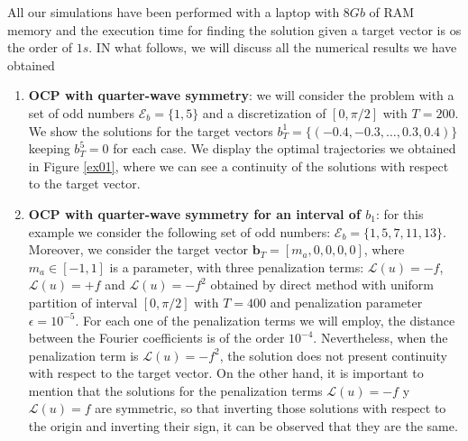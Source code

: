 All our simulations have been performed with a laptop with $8Gb$ of RAM memory and the execution time for finding the solution given a target vector is os the order of $1s$. IN what follows, we will discuss all the numerical results we have obtained
\begin{enumerate}    
    \item \textbf{OCP with quarter-wave symmetry}: we will consider the problem with a set of odd numbers $\mathcal{E}_b = \{1,5\}$ and a discretization of $[0,\pi/2]$ with $T = 200$. We show the solutions for the target vectors $b_T^1 = \{(-0.4,-0.3,\dots,0.3,0.4)\}$ keeping $b_T^5=0$ for each case. We display the optimal trajectories we obtained in Figure \ref{ex01}, where we can see a continuity of the solutions with respect to the target vector.



    \item \textbf{OCP with quarter-wave symmetry for an interval of $b_1$}: for this example we consider the following set of odd numbers: $\mathcal{E}_b = \{1,5,7,11,13\}$. 
    Moreover, we consider the target vector $\bm{b}_T = [m_a,0,0,0,0]$, where $m_a \in [-1,1]$ is a parameter, with three penalization terms: $\mathcal{L}(u) = -f$, $\mathcal{L}(u) = +f$ and $\mathcal{L}(u) = -f^2$ obtained by direct method with uniform partition of interval $[0,\pi/2]$ with $T=400$ and penalization parameter $\epsilon = 10^{-5}$. 
    For each one of the penalization terms we will employ, the distance between the Fourier coefficients is of the order $10^{-4}$. 
    Nevertheless, when the penalization term is $\mathcal{L}(u)= -f^2$, the solution does not present continuity with respect to the target vector. 
    On the other hand, it is important to mention that the solutions for the penalization terms $\mathcal{L}(u) = -f$ y $\mathcal{L}(u) = f$ are symmetric, so that inverting those solutions with respect to the origin and inverting their sign, it can be observed that they are the same.
     

\end{enumerate}
